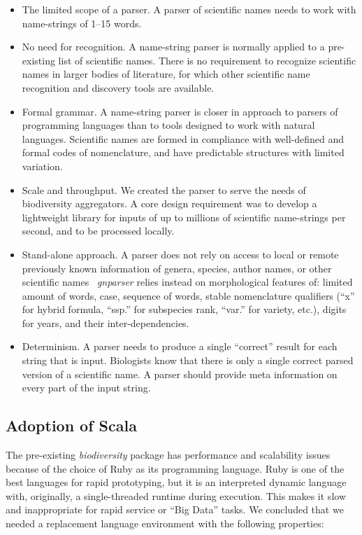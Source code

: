 \documentclass{bmcart}
\begin{document}
\begin{itemize}
  \item The limited scope of a parser. A parser of scientific names needs to work with name-strings of 1--15 words.

   \item No need for recognition.  A name-string parser is normally applied to a pre-existing list of scientific names. There is no requirement to recognize scientific names in larger bodies of literature, for which other scientific name recognition and discovery tools are available.

  \item Formal grammar. A name-string parser is closer in approach to parsers of programming languages than to tools designed to work with natural languages. Scientific names are formed in compliance with well-defined and formal codes of nomenclature, and have predictable structures with limited variation.

  \item Scale and throughput. We created the parser to serve the  needs of biodiversity aggregators. A core design requirement was to develop a lightweight library for inputs of up to millions of scientific name-strings per second, and to be processed locally.

  \item Stand-alone approach. A parser does not rely on access to local or remote previously known information of genera, species, author names, or other scientific names \ \textit{gnparser} relies instead on morphological features of: limited amount of words, case, sequence of words, stable nomenclature qualifiers (``x'' for hybrid formula, ``ssp.'' for subspecies rank, ``var.'' for variety, etc.), digits for years, and their inter-dependencies.

  \item Determinism. A parser needs to produce a single ``correct'' result for each string that is input. Biologists know that there is only a single correct parsed version of a scientific name. A parser should provide meta information on every part of the input string.
\end{itemize}

\subsection*{Adoption of Scala}

The pre-existing \textit{biodiversity} package has performance and scalability issues because of the choice of Ruby as its programming language. Ruby is one of the best languages for rapid prototyping, but it is an interpreted dynamic language with, originally, a single-threaded runtime during execution. This makes it slow and inappropriate for rapid service or ``Big Data'' tasks. We concluded that we needed a replacement language environment with the following properties:
\end{document}

